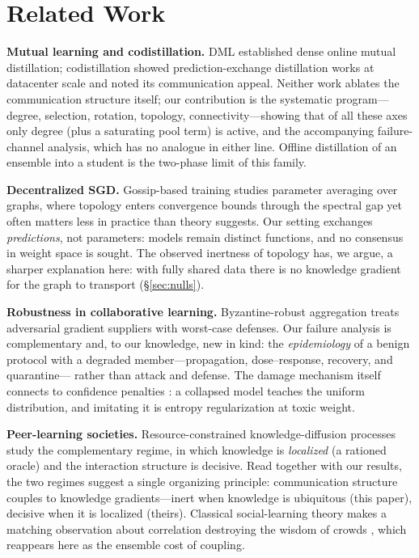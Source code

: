 \documentclass[10pt,twocolumn]{article}
\begin{document}
\section{Related Work}

\textbf{Mutual learning and codistillation.} DML \citep{zhang2018deep}
established dense online mutual distillation; codistillation
\citep{anil2018large} showed prediction-exchange distillation works at
datacenter scale and noted its communication appeal. Neither work ablates the
communication structure itself; our contribution is the systematic
program---degree, selection, rotation, topology, connectivity---showing that
of all these axes only degree (plus a saturating pool term) is active, and
the accompanying failure-channel analysis, which has no analogue in either
line. Offline distillation of an ensemble into a student
\citep{hinton2015distilling} is the two-phase limit of this family.

\textbf{Decentralized SGD.} Gossip-based training
\citep{lian2017can,ying2021exponential} studies parameter averaging over
graphs, where topology enters convergence bounds through the spectral gap yet
often matters less in practice than theory suggests. Our setting exchanges
\emph{predictions}, not parameters: models remain distinct functions, and no
consensus in weight space is sought. The observed inertness of topology has,
we argue, a sharper explanation here: with fully shared data there is no
knowledge gradient for the graph to transport (\S\ref{sec:nulls}).

\textbf{Robustness in collaborative learning.} Byzantine-robust aggregation
\citep{blanchard2017machine} treats adversarial gradient suppliers with
worst-case defenses. Our failure analysis is complementary and, to our
knowledge, new in kind: the \emph{epidemiology} of a benign protocol with a
degraded member---propagation, dose--response, recovery, and quarantine---
rather than attack and defense. The damage mechanism itself connects to
confidence penalties \citep{pereyra2017regularizing,szegedy2016rethinking}:
a collapsed model teaches the uniform distribution, and imitating it is
entropy regularization at toxic weight.

\textbf{Peer-learning societies.} Resource-constrained knowledge-diffusion
processes \citep{beikihassan2023resource} study the complementary regime, in
which knowledge is \emph{localized} (a rationed oracle) and the interaction
structure is decisive. Read together with our results, the two regimes
suggest a single organizing principle: communication structure couples to
knowledge gradients---inert when knowledge is ubiquitous (this paper),
decisive when it is localized (theirs). Classical social-learning theory
makes a matching observation about correlation destroying the wisdom of
crowds \citep{golub2010naive}, which reappears here as the ensemble cost of
coupling.
\end{document}
